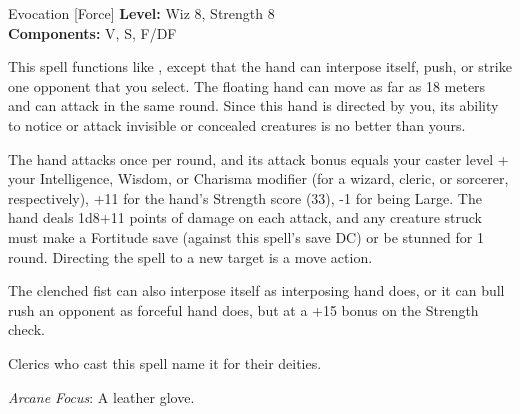 {Evocation [Force]}
{
	\textbf{Level:}
	Wiz 8, Strength 8\\
	\textbf{Components:}
	V, S, F/DF\\
}
{
	This spell functions like , except that the hand can interpose itself, push, or strike one opponent that you select. The floating hand can move as far as 18 meters and can attack in the same round. Since this hand is directed by you, its ability to notice or attack invisible or concealed creatures is no better than yours.

	The hand attacks once per round, and its attack bonus equals your caster level + your Intelligence, Wisdom, or Charisma modifier (for a wizard, cleric, or sorcerer, respectively), +11 for the hand's Strength score (33), -1 for being Large. The hand deals 1d8+11 points of damage on each attack, and any creature struck must make a Fortitude save (against this spell's save DC) or be stunned for 1 round. Directing the spell to a new target is a move action.

	The clenched fist can also interpose itself as interposing hand does, or it can bull rush an opponent as forceful hand does, but at a +15 bonus on the Strength check.

Clerics who cast this spell name it for their deities.

	\textit{Arcane Focus}:
	A leather glove.

}
